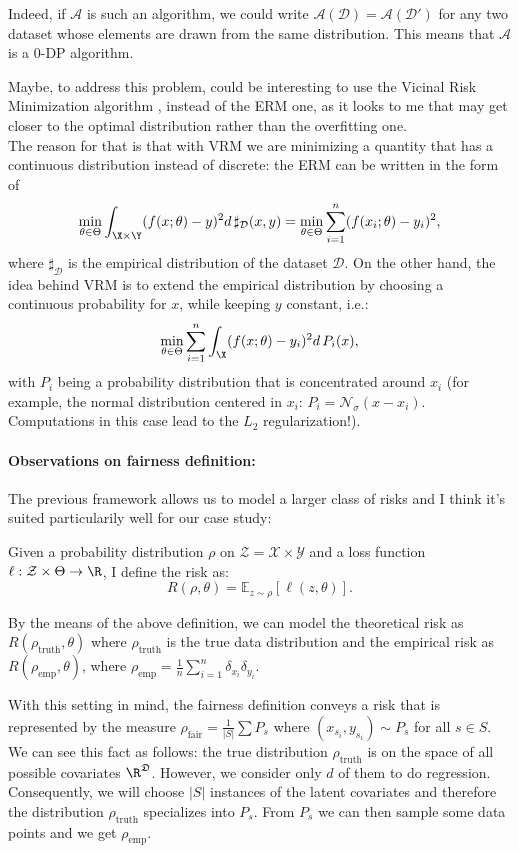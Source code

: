 Indeed, if $\mathcal{A}$ is such an algorithm, we could write $\mathcal{A}(\mathcal{D})=\mathcal{A}(\mathcal{D}')$ for any two dataset whose elements are drawn from the same distribution.
This means that $\mathcal{A}$ is a $0$-DP algorithm.


Maybe, to address this problem, could be interesting to use the Vicinal Risk Mini\-miza\-tion algorithm \cite{vapnis_VRM_2000}, instead of the ERM one, as it looks to me that may get closer to the optimal distribution rather than the overfitting one. \\
The reason for that is that with VRM we are minimizing a quantity that has a continuous distribution instead of discrete:
the ERM can be written in the form of 
$$\min_{\theta\in\Theta} \int_{\X\times\Y} (f(x;\theta)-y)^2 d\,\sharp_\mathcal{D}(x,y) = \min_{\theta\in\Theta} \sum_{i=1}^n (f(x_i;\theta)-y_i)^2,$$
where $\sharp_\mathcal{D}$ is the empirical distribution of the dataset $\mathcal{D}$.
On the other hand, the idea behind VRM is to extend the empirical distribution by choosing a continuous probability for $x$, while keeping $y$ constant, i.e.:
$$\min_{\theta\in\Theta} \sum_{i=1}^n\int_{\X} (f(x;\theta)-y_i)^2 d\,P_i(x),$$
with $P_i$ being a probability distribution that is concentrated around $x_i$ (for example, the normal distribution centered in $x_i$: $P_i = \mathcal{N}_\sigma(x-x_i)$. Computations in this case lead to the $L_2$ regularization!).\\

\paragraph{Observations on fairness definition:}
The previous framework allows us to model a larger class of risks and I think it's suited particularily well for our case study:
\begin{definition}
  Given a probability distribution $\rho$ on $\mathcal{Z}=\mathcal{X}\times\mathcal{Y}$ and a loss function $\ell:\mathcal{Z}\times\Theta\to\R$, I define the risk as:
  $$ R(\rho,\theta) = \mathbb{E}_{z\sim\rho}[\ell(z,\theta)].
  $$
\end{definition}
By the means of the above definition, we can model the theoretical risk as $R(\rho_{\mathrm{truth}},\theta)$ where $\rho_{\mathrm{truth}}$ is the true data distribution and the empirical risk as $R(\rho_{\mathrm{emp}},\theta)$, where $\rho_{\mathrm{emp}}=\frac{1}{n} \sum_{i=1}^n \delta_{x_i}\delta_{y_i}$.

With this setting in mind, the fairness definition conveys a risk that is represented by the measure $\rho_{\text{fair}}=\frac{1}{|S|} \sum P_s$ where $(x_{s_i}, y_{s_i})\sim P_s$ for all $s\in S$.\\
We can see this fact as follows: the true distribution $\rho_{\mathrm{truth}}$ is on the space of all possible covariates $\R^\mathfrak{D}$. 
However, we consider only $d$ of them to do regression. 
Consequently, we will choose $|S|$ instances of the latent covariates and therefore the distribution $\rho_{\mathrm{truth}}$ specializes into $P_s$. 
From $P_s$ we can then sample some data points and we get $\rho_{\mathrm{emp}}$.

